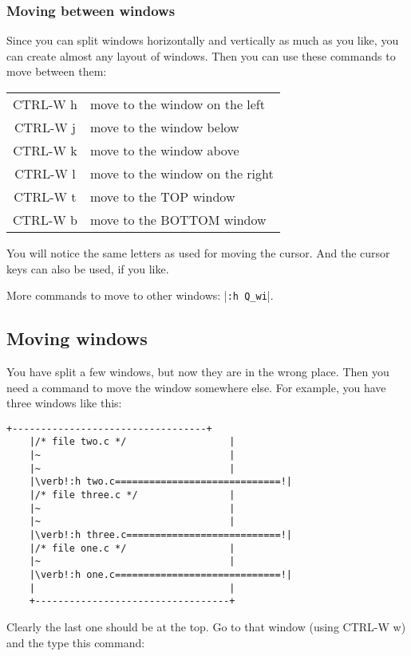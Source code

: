 \subsubsection{Moving between windows}
Since you can split windows horizontally and vertically as much as you like, you can create almost any layout of windows.
Then you can use these commands to move between them:

\begin{center}
				\begin{longtable}{c l}
				CTRL-W h & move to the window on the left\\
				CTRL-W j & move to the window below\\
				CTRL-W k & move to the window above\\
				CTRL-W l & move to the window on the right\\
				CTRL-W t & move to the TOP window\\
				CTRL-W b & move to the BOTTOM window\\
\end{longtable}
\end{center}

You will notice the same letters as used for moving the cursor.
And the cursor keys can also be used, if you like.

More commands to move to other windows: |\verb!:h Q_wi!|.
\subsection{Moving windows}
You have split a few windows, but now they are in the wrong place.
Then you need a command to move the window somewhere else.
For example, you have three windows like this:

\begin{Verbatim}[samepage=true]
    +----------------------------------+
    |/* file two.c */                  |
    |~                                 |
    |~                                 |
    |\verb!:h two.c=============================!|
    |/* file three.c */                |
    |~                                 |
    |~                                 |
    |\verb!:h three.c===========================!|
    |/* file one.c */                  |
    |~                                 |
    |\verb!:h one.c=============================!|
    |                                  |
    +----------------------------------+
\end{Verbatim}

Clearly the last one should be at the top.
Go to that window (using CTRL-W w) and the type this command:

